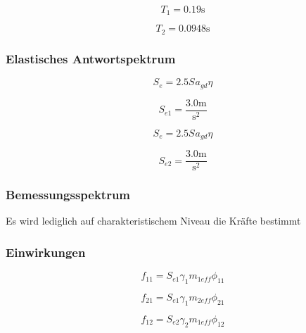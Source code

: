 \documentclass[
  letterpaper,
  DIV=11]{scrreprt}
\begin{document}
\begin{equation*}T_{1} = 0.19 \text{s}\end{equation*}

\begin{equation*}T_{2} = 0.0948 \text{s}\end{equation*}

\hypertarget{elastisches-antwortspektrum-1}{%
\subsubsection{Elastisches
Antwortspektrum}\label{elastisches-antwortspektrum-1}}

\begin{equation*}S_{e} = 2.5 S_{} a_{gd} \eta\end{equation*}

\begin{equation*}S_{e 1} = \frac{3.0 \text{m}}{\text{s}^{2}}\end{equation*}

\begin{equation*}S_{e} = 2.5 S_{} a_{gd} \eta\end{equation*}

\begin{equation*}S_{e 2} = \frac{3.0 \text{m}}{\text{s}^{2}}\end{equation*}

\hypertarget{bemessungsspektrum}{%
\subsubsection{Bemessungsspektrum}\label{bemessungsspektrum}}

Es wird lediglich auf charakteristischem Niveau die Kräfte bestimmt

\hypertarget{einwirkungen}{%
\subsubsection{Einwirkungen}\label{einwirkungen}}

\begin{equation*}f_{11} = S_{e 1} \gamma_{1} m_{1 eff} \phi_{11}\end{equation*}

\begin{equation*}f_{21} = S_{e 1} \gamma_{1} m_{2 eff} \phi_{21}\end{equation*}

\begin{equation*}f_{12} = S_{e 2} \gamma_{2} m_{1 eff} \phi_{12}\end{equation*}
\end{document}
